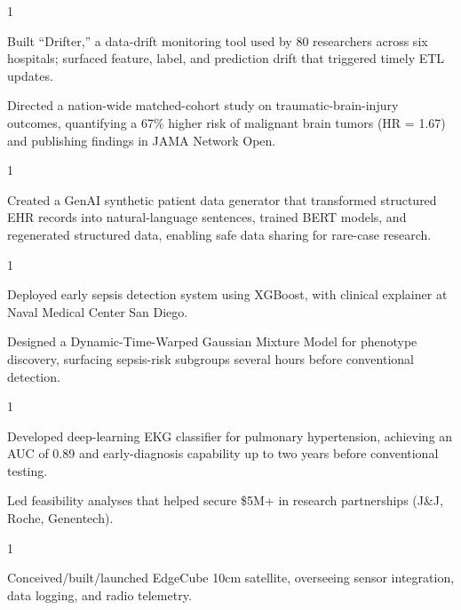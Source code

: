 \documentclass[letterpaper, 11pt]{resume}
\begin{document}
\begin{entryList}{1}
	\item Built ``Drifter,'' a data-drift monitoring tool used by 80 researchers across six hospitals; surfaced feature, label, and prediction drift that triggered timely ETL updates.
	\item Directed a nation-wide matched-cohort study on traumatic-brain-injury outcomes, quantifying a 67\% higher risk of malignant brain tumors (HR = 1.67) and publishing findings in JAMA Network Open.
\end{entryList}

\begin{entryList}{1}
	\item Created a GenAI synthetic patient data generator that transformed structured EHR records into natural-language sentences, trained BERT models, and regenerated structured data, enabling safe data sharing for rare-case research.
\end{entryList}

\begin{entryList}{1}
    \item Deployed early sepsis detection system using XGBoost, with clinical explainer at Naval Medical Center San Diego.
    \item Designed a Dynamic-Time-Warped Gaussian Mixture Model for phenotype discovery, surfacing sepsis-risk subgroups several hours before conventional detection.
\end{entryList}

\begin{entryList}{1}
	\item Developed deep-learning EKG classifier for pulmonary hypertension, achieving an AUC of 0.89 and early-diagnosis capability up to two years before conventional testing.
	\item Led feasibility analyses that helped secure \$5M+ in research partnerships (J\&J, Roche, Genentech).
\end{entryList}

\begin{entryList}{1}
	\item Conceived/built/launched EdgeCube 10cm satellite, overseeing sensor integration, data logging, and radio telemetry.
\end{entryList}
\end{document}

